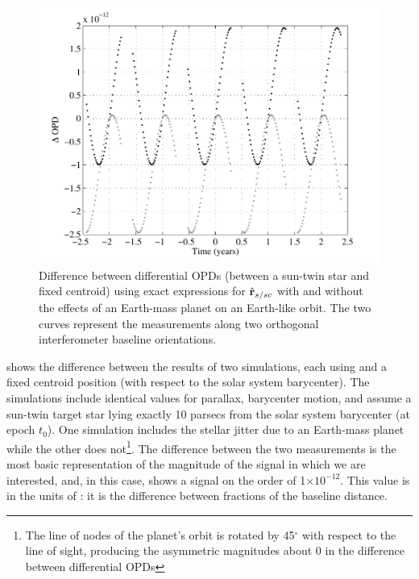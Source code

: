 \begin{figure}[ht]
\centering
\includegraphics[width=5.5in]{./figures/planet_effects}
 \caption[Astrometric wobble due to Earth mass planet]{ Difference between differential OPDs (between a sun-twin star and fixed centroid) using exact expressions for $\hat{\mathbf{r}}_{s/sc}$ with and without the effects of an Earth-mass planet on an Earth-like orbit. The two curves represent the measurements along two orthogonal interferometer baseline orientations.\label{fig:planet_effects}}
\end{figure} 
 shows the difference between the results of two simulations, each using  and a fixed centroid position (with respect to the solar system barycenter).  The simulations include identical values for parallax, barycenter motion, and assume a sun-twin target star lying exactly 10 parsecs from the solar system barycenter (at epoch $t_0$). One simulation includes the stellar jitter due to an Earth-mass planet while the other does not\setcounter{footnote}{1}\footnote{The line of nodes of the planet's orbit is rotated by 45$^\circ$ with respect to the line of sight, producing the asymmetric magnitudes about 0 in the difference between differential OPDs}.  The difference between the two measurements is the most basic representation of the magnitude of the signal in which we are interested, and, in this case, shows a signal on the order of 1$\times10^{-12}$. This value is in the units of : it is the difference between fractions of the baseline distance. 

